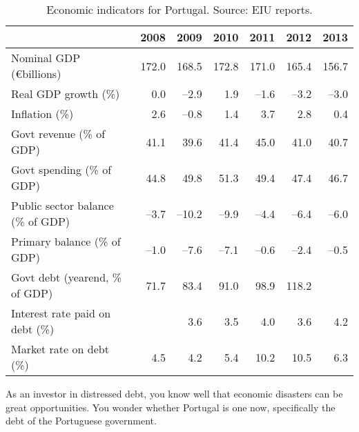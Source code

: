 \documentclass[letterpaper,12pt]{exam}
\begin{document}
\begin{questions}
\begin{solution}
\end{solution}

\begin{table}[h]
\centering
\begin{tabular}{lrrrrrr}
\toprule
        & 2008 & 2009 & 2010 & 2011 & 2012 & 2013 \\
\midrule
Nominal GDP (\euro billions) & 172.0 & 168.5 & 172.8 & 171.0 & 165.4 & 156.7 \\
Real GDP growth (\%) & 0.0 & --2.9 & 1.9 & --1.6 & --3.2 & --3.0 \\
Inflation (\%) & 2.6 & --0.8 & 1.4 & 3.7 & 2.8 & 0.4 \\
Govt revenue (\% of GDP)  & 41.1 & 39.6 & 41.4 & 45.0 & 41.0 & 40.7 \\
Govt spending (\% of GDP) & 44.8 & 49.8 & 51.3 & 49.4 & 47.4 & 46.7  \\
Public sector balance (\% of GDP) & --3.7 & --10.2 & --9.9 & --4.4 & --6.4 & --6.0\\
Primary balance (\% of GDP)  & --1.0 & --7.6 &  --7.1 & --0.6 & --2.4 & --0.5   \\
Govt debt (yearend, \% of GDP) & 71.7 & 83.4 & 91.0 & 98.9 & 118.2 \\
Interest rate paid on debt (\%) &  & 3.6 & 3.5 & 4.0 & 3.6	& 4.2 \\
Market rate on debt (\%)        & 4.5 & 4.2 & 5.4 & 10.2 & 10.5 & 6.3 \\
\bottomrule
\end{tabular}
\label{tab:portugal}
\caption{Economic indicators for Portugal.  Source:  EIU reports.}
\end{table}

As an investor in distressed debt,
you know well that economic disasters can be great opportunities.
You wonder whether Portugal is one now, specifically
the debt of the Portuguese government.


\end{questions}
\end{document}
